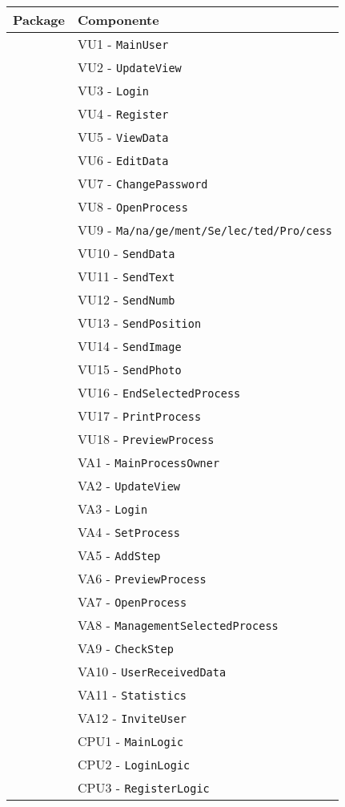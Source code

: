 \begin{longtable}{XX}
\toprule
\textbf{Package} & \textbf{Componente}\\
\midrule
\viewUser{}&VU1 - \texttt{MainUser}\\
&VU2 - \texttt{UpdateView}\\
&VU3 - \texttt{Login}\\
&VU4 - \texttt{Register}\\
&VU5 - \texttt{ViewData}\\
&VU6 - \texttt{EditData}\\
&VU7 - \texttt{ChangePassword}\\
&VU8 - \texttt{OpenProcess}\\
&VU9 - \texttt{Ma\fshyp{}na\fshyp{}ge\fshyp{}ment\fshyp{}Se\fshyp{}lec\fshyp{}ted\fshyp{}Pro\fshyp{}cess}\\
&VU10 - \texttt{SendData}\\
&VU11 - \texttt{SendText}\\
&VU12 - \texttt{SendNumb}\\
&VU13 - \texttt{SendPosition}\\
&VU14 - \texttt{SendImage}\\
&VU15 - \texttt{SendPhoto}\\
&VU16 - \texttt{EndSelectedProcess}\\
&VU17 - \texttt{PrintProcess}\\
&VU18 - \texttt{PreviewProcess}\\
\midrule
\viewAdmin{}&VA1 - \texttt{MainProcessOwner}\\
&VA2 - \texttt{UpdateView}\\
&VA3 - \texttt{Login}\\
&VA4 - \texttt{SetProcess}\\
&VA5 - \texttt{AddStep}\\
&VA6 - \texttt{PreviewProcess}\\
&VA7 - \texttt{OpenProcess}\\
&VA8 - \texttt{ManagementSelectedProcess}\\
&VA9 - \texttt{CheckStep}\\
&VA10 - \texttt{UserReceivedData}\\
&VA11 - \texttt{Statistics}\\
&VA12 - \texttt{InviteUser}\\
\midrule
\logicUser{}&CPU1 - \texttt{MainLogic}\\
&CPU2 - \texttt{LoginLogic}\\
&CPU3 - \texttt{RegisterLogic}\\

\end{longtable}
